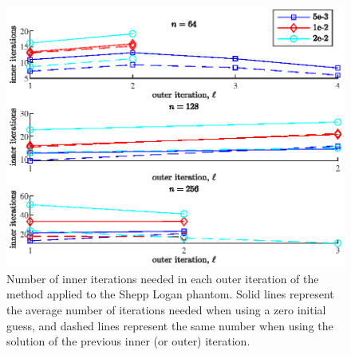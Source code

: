 \begin{figure}[htbp]
\begin{center}
\includegraphics{figures/zero_initial_guess_vs_previous_iteration}
\caption{Number of inner iterations needed in each outer iteration of the method applied to the Shepp Logan phantom. Solid lines represent the average number of iterations needed when using a zero initial guess, and dashed lines represent the same number when using the solution of the previous inner (or outer) iteration.}
\label{fig:zero_initial_guess_vs_previous_iteration}
\end{center}
\end{figure}

